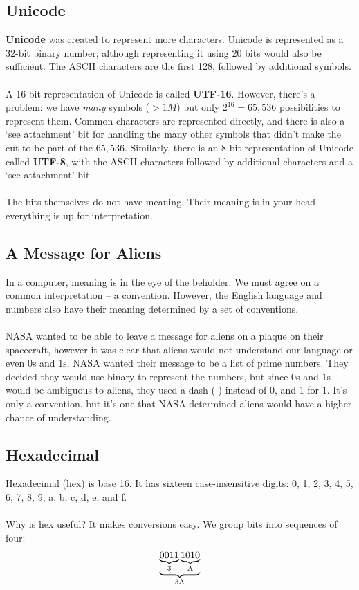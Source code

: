 \documentclass[]{article}
\theoremstyle{definition}
\newcommand{\lecture}[1]{\marginpar{{\footnotesize $\leftarrow$ \underline{#1}}}}
\begin{document}
		\subsection{Unicode}
			\textbf{Unicode} was created to represent more characters. Unicode is represented as a 32-bit binary number, although representing it using 20 bits would also be sufficient. The ASCII characters are the first 128, followed by additional symbols.
			\\ \\
			A 16-bit representation of Unicode is called \textbf{UTF-16}. However, there's a problem: we have \emph{many} symbols ($> 1M$) but only $2^{16} = 65,536$ possibilities to represent them. Common characters are represented directly, and there is also a `see attachment' bit for handling the many other symbols that didn't make the cut to be part of the $65,536$. Similarly, there is an 8-bit representation of Unicode called \textbf{UTF-8}, with the ASCII characters followed by additional characters and a `see attachment' bit.
			\\ \\
			The bits themselves do not have meaning. Their meaning is in your head -- everything is up for interpretation.
		\subsection{A Message for Aliens} \lecture{January 9, 2013}
			In a computer, meaning is in the eye of the beholder. We must agree on a common interpretation -- a convention. However, the English language and numbers also have their meaning determined by a set of conventions.
			\\ \\
			NASA wanted to be able to leave a message for aliens on a plaque on their spacecraft, however it was clear that aliens would not understand our language or even 0s and 1s. NASA wanted their message to be a list of prime numbers. They decided they would use binary to represent the numbers, but since 0s and 1s would be ambiguous to aliens, they used a dash (-) instead of 0, and 1 for 1. It's only a convention, but it's one that NASA determined aliens would have a higher chance of understanding.
		\subsection{Hexadecimal}
			Hexadecimal (hex) is base 16. It has sixteen case-insensitive digits: 0, 1, 2, 3, 4, 5, 6, 7, 8, 9, a, b, c, d, e, and f.
			\\ \\
			Why is hex useful? It makes conversions easy. We group bits into sequences of four:
			\begin{align*}
			  \underbrace{\underbrace{0011}_{3} \underbrace{1010}_{\text A}}_{\text{3A}}
			\end{align*}
\end{document}
